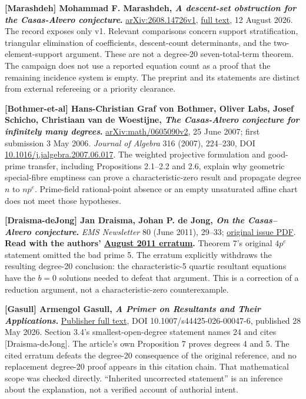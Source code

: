 \documentclass[
  british,
  10pt,
]{article}
\begin{document}
\textbf{{[}Marashdeh{]} Mohammad F. Marashdeh, \emph{A descent-set
obstruction for the Casas-Alvero conjecture}.}
\href{https://arxiv.org/abs/2608.14726v1}{arXiv:2608.14726v1},
\href{https://arxiv.org/html/2608.14726v1}{full text}, 12 August 2026.
The record exposes only v1. Relevant comparisons concern support
stratification, triangular elimination of coefficients, descent-count
determinants, and the two-element-support argument. These are not a
degree-20 seven-total-term theorem. The campaign does not use a reported
equation count as a proof that the remaining incidence system is empty.
The preprint and its statements are distinct from external refereeing or
a priority clearance.

\textbf{{[}Bothmer-et-al{]} Hans-Christian Graf von Bothmer, Oliver
Labs, Josef Schicho, Christiaan van de Woestijne, \emph{The Casas-Alvero
conjecture for infinitely many degrees}.}
\href{https://arxiv.org/abs/math/0605090v2}{arXiv:math/0605090v2}, 25
June 2007; first submission 3 May 2006. \emph{Journal of Algebra} 316
(2007), 224--230, DOI
\href{https://doi.org/10.1016/j.jalgebra.2007.06.017}{10.1016/j.jalgebra.2007.06.017}.
The weighted projective formulation and good-prime transfer, including
Propositions 2.1--2.2 and 2.6, explain why geometric special-fibre
emptiness can prove a characteristic-zero result and propagate degree
\(n\) to \(np^e\). Prime-field rational-point absence or an empty
unsaturated affine chart does not meet those hypotheses.

\textbf{{[}Draisma-deJong{]} Jan Draisma, Johan P. de Jong, \emph{On the
Casas--Alvero conjecture}.} \emph{EMS Newsletter} 80 (June 2011),
29--33;
\href{https://ems.press/content/serial-issue-files/13698}{original issue
PDF}. \textbf{Read with the authors'
\href{https://math-unibe.ch/jdraisma/publications/erratumcasasalvero.pdf}{August
2011 erratum}.} Theorem 7's original \(4p^e\) statement omitted the bad
prime 5. The erratum explicitly withdraws the resulting degree-20
conclusion: the characteristic-5 quartic resultant equations have the
\(b=0\) solutions needed to defeat that argument. This is a correction
of a reduction argument, not a characteristic-zero counterexample.

\textbf{{[}Gasull{]} Armengol Gasull, \emph{A Primer on Resultants and
Their Applications}.}
\href{https://link.springer.com/article/10.1007/s44425-026-00047-6}{Publisher
full text}, DOI 10.1007/s44425-026-00047-6, published 28 May 2026.
Section 3.4's smallest-open-degree statement names 24 and cites
{[}Draisma-deJong{]}. The article's own Proposition 7 proves degrees 4
and 5. The cited erratum defeats the degree-20 consequence of the
original reference, and no replacement degree-20 proof appears in this
citation chain. That mathematical scope was checked directly.
``Inherited uncorrected statement'' is an inference about the
explanation, not a verified account of authorial intent.
\end{document}
